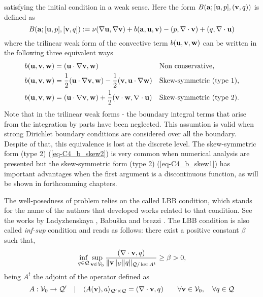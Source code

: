 satisfying the initial condition  in a weak sense. Here the form $B({{\bf a}};[{\bf u},p],({\bf v},q))$ is defined as 
\begin{equation}
\label{eq-C2_bilinear}
B({\bf a};[{\bf u},p],[{\bf v},q]):=\nu(\nabla{\bf u},\nabla{\bf v})+b({\bf a},{\bf u},{\bf v})-(p,\nabla\cdot{\bf v})+(q,\nabla\cdot{\bf u})
\end{equation}
where the trilinear weak form of the convective term $b({\bf u},{\bf v},{\bf w})$ can be written in the following three equivalent ways
\begin{align}
\label{eq-C2_b_noskew}
&b({\bf u},{\bf v},{\bf w})=({\bf u}\cdot\nabla{\bf v},{\bf w})&&\mbox{Non conservative},\\
\label{eq-C2_b_skew1}
&b({\bf u},{\bf v},\mathbf{w})=\frac{1}{2}({\bf u}\cdot\nabla{\bf v},\mathbf{w})-\frac{1}{2}({\bf v},{\bf u}\cdot\nabla\mathbf{w})&&\mbox{Skew-symmetric (type 1)},\\
\label{eq-C2_b_skew2}
&b({\bf u},{\bf v},\mathbf{w})=({\bf u}\cdot\nabla{\bf v},\mathbf{w})+\frac{1}{2}({\bf v}\cdot\mathbf{w},\nabla\cdot{\bf u})&&\mbox{Skew-symmetric (type 2)}.
\end{align}
Note that in the trilinear weak forms - the boundary integral terms that arise from the integration by parts have been neglected. This assumtion is valid when strong Dirichlet boundary conditions are considered over all the boundary. Despite of that, this equivalence is lost at the discrete level. The skew-symmetric form (type 2) (\ref{eq-C4_b_skew2}) is very common when numerical analysis are presented \cite{Badia2013Convergence,Burman2009,guermond_faedogalerkin_2007} but the skew-symmetric form (type 2) (\ref{eq-C4_b_skew1}) has important advantages when the first argument is a discontinuous function, as will be shown in forthcomming chapters.

The well-posedness of problem  relies on the called LBB condition, which stands for the name of the authors that developed works related to that condition. See the works by Ladyzhenskaya \cite{Ladyzhenskaya}, Babu\^{s}ka \cite{babuska} and brezzi \cite{brezzi}. The LBB condition is also called \textit{inf-sup} condition and reads as follows: there exist a positive constant $ \beta $ such that,
\begin{equation}
\label{eq-C2_lbb}
\inf_{q\in\mathcal{Q}}\sup_{{\bf v}\in\mathcal{V}_0}\frac{(\nabla\cdot{\bf v},q)}{\|{\bf v}\|_\mathcal{V}\|q\|_{\mathcal{Q}/\ker A^t}}\ge\beta>0,
\end{equation}
being $ A^t $ the adjoint of the operator defined as 
\begin{equation}
\label{eq-C2_lbb_operator}
A: \mathcal{V}_0\rightarrow\mathcal{Q'} \quad| \quad\langle A({\bf v}),a\rangle_{\mathcal{Q'}\times\mathcal{Q}}=(\nabla\cdot{\bf v},q)\quad\quad\forall{\bf v}\in\mathcal{V}_0,\quad\forall q\in\mathcal{Q}
\end{equation}

